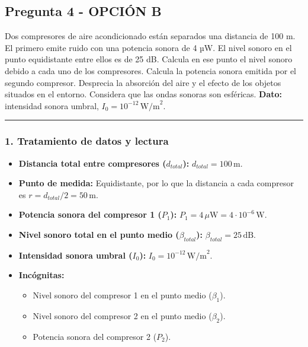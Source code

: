 \subsection{Pregunta 4 - OPCIÓN B}
\label{subsec:4B_2025_jun_ord}

\begin{cajaenunciado}
Dos compresores de aire acondicionado están separados una distancia de 100 m. El primero emite ruido con una potencia sonora de 4 µW. El nivel sonoro en el punto equidistante entre ellos es de 25 dB. Calcula en ese punto el nivel sonoro debido a cada uno de los compresores. Calcula la potencia sonora emitida por el segundo compresor. Desprecia la absorción del aire y el efecto de los objetos situados en el entorno. Considera que las ondas sonoras son esféricas.
\textbf{Dato:} intensidad sonora umbral, $I_{0}=10^{-12}\,\text{W/m}^2$.
\end{cajaenunciado}
\hrule

\subsubsection*{1. Tratamiento de datos y lectura}
\begin{itemize}
    \item \textbf{Distancia total entre compresores ($d_{total}$):} $d_{total} = 100 \, \text{m}$.
    \item \textbf{Punto de medida:} Equidistante, por lo que la distancia a cada compresor es $r = d_{total}/2 = 50 \, \text{m}$.
    \item \textbf{Potencia sonora del compresor 1 ($P_1$):} $P_1 = 4 \, \mu\text{W} = 4 \cdot 10^{-6} \, \text{W}$.
    \item \textbf{Nivel sonoro total en el punto medio ($\beta_{total}$):} $\beta_{total} = 25 \, \text{dB}$.
    \item \textbf{Intensidad sonora umbral ($I_0$):} $I_0 = 10^{-12} \, \text{W/m}^2$.
    \item \textbf{Incógnitas:}
    \begin{itemize}
        \item Nivel sonoro del compresor 1 en el punto medio ($\beta_1$).
        \item Nivel sonoro del compresor 2 en el punto medio ($\beta_2$).
        \item Potencia sonora del compresor 2 ($P_2$).
    \end{itemize}
\end{itemize}

